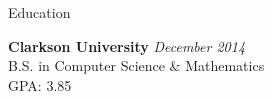\documentclass{resume} %
\begin{document}

\begin{rSection}{Education}

{\bf Clarkson University} \hfill {\em December 2014} \\ 
B.S. in Computer Science \& Mathematics \\
GPA: 3.85

\end{rSection}

\end{document}
